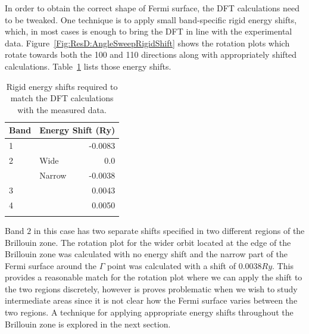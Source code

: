In order to obtain the correct shape of Fermi surface, the \ac{DFT} calculations need to be tweaked. One technique is to apply small band-specific rigid energy shifts, which, in most cases is enough to bring the \ac{DFT} in line with the experimental data. Figure~\ref{Fig:ResD:AngleSweepRigidShift} shows the rotation plots which rotate towards both the 100 and 110 directions along with appropriately shifted calculations. Table~\ref{Tab:ResD:EnergyShifts} lists those energy shifts.
\begin{table}
    \begin{center}
        \caption{Rigid energy shifts required to match the \ac{DFT} calculations with the measured data.}
        \begin{tabular}[htbp]{llr}
\toprule
Band    & \multicolumn{2}{l}{Energy Shift (\unit{Ry})} \\
\midrule
1       &       & -0.0083      \\
2       & Wide  & 0.0          \\
        & Narrow & -0.0038     \\
3       &       & 0.0043       \\
4       &       & 0.0050        \\
\bottomrule
        \label{Tab:ResD:EnergyShifts}
        \end{tabular}
    \end{center}
\end{table}

Band $2$ in this case has two separate shifts specified in two different regions of the Brillouin zone. The rotation plot for the wider orbit located at the edge of the Brillouin zone was calculated with no energy shift and the narrow part of the Fermi surface around the $\Gamma$ point was calculated with a shift of $0.0038\unit{Ry}$. This provides a reasonable match for the rotation plot where we can apply the shift to the two regions discretely, however is proves problematic when we wish to study intermediate areas since it is not clear how the Fermi surface varies between the two regions. A technique for applying appropriate energy shifts throughout the Brillouin zone is explored in the next section.

